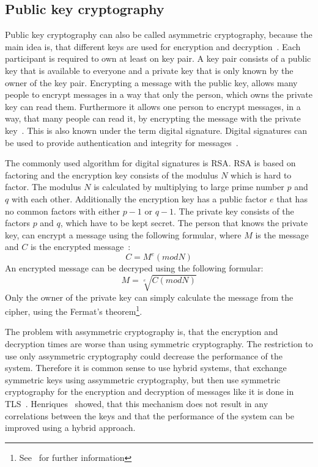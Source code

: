 \subsection{Public key cryptography}
Public key cryptography can also be called asymmetric cryptography, because the main idea is, that different keys are used for encryption and decryption~\cite{anderson2020security}.
Each participant is required to own at least on key pair.
A key pair consists of a public key that is available to everyone and a private key that is only known by the owner of the key pair.
Encrypting a message with the public key, allows many people to encrypt messages in a way that only the person, which owns the private key can read them.
Furthermore it allows one person to encrypt messages, in a way, that many people can read it, by encrypting the message with the private key~\cite{henriques2017using}.
This is also known under the term digital signature. 
Digital signatures can be used to provide authentication and integrity for messages~\cite{anderson2020security}.

The commonly used algorithm for digital signatures is RSA.
RSA is based on factoring and the encryption key consists of the modulus $N$ which is hard to factor.
The modulus $N$ is calculated by multiplying to large prime number $p$ and $q$ with each other.
Additionally the encryption key has a public factor $e$ that has no common factors with either $p-1$ or $q-1$.
The private key consists of the factors $p$ and $q$, which have to be kept secret.
The person that knows the private key, can encrypt a message using the following formular, where $M$ is the message and $C$ is the encrypted message~\cite{anderson2020security}:
\begin{displaymath}
	C = M^e (mod N)
\end{displaymath}
An encrypted message can be decryped using the following formular:
\begin{displaymath}
	M = \sqrt[e]{C (mod N)}
\end{displaymath}
Only the owner of the private key can simply calculate the message from the cipher, using the Fermat's theorem\footnote{See~\cite{anderson2020security} for further information}.

The problem with assymmetric cryptography is, that the encryption and decryption times are worse than using symmetric cryptography.
The restriction to use only assymmetric cryptography could decrease the performance of the system.
Therefore it is common sense to use hybrid systems, that exchange symmetric keys using assymmetric cryptography, but then use symmetric cryptography for the encryption and decryption of messages like it is done in TLS~\cite{henriques2017using}.
Henriques~\cite{henriques2017using} showed, that this mechanism does not result in any correlations between the keys and that the performance of the system can be improved using a hybrid approach.


